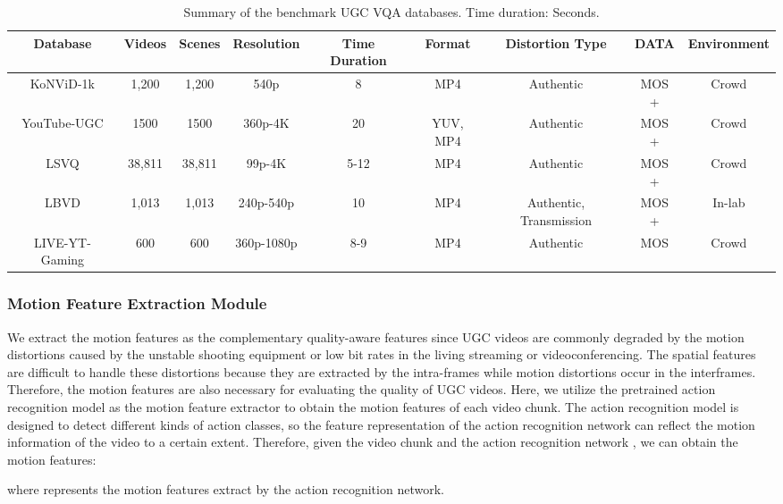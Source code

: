 \documentclass[sigconf]{acmart}
\begin{document}
\begin{table*}
\small
	\centering
	\renewcommand{\arraystretch}{1}
	\caption{Summary of the benchmark UGC VQA databases. Time duration: Seconds.}
	\label{the_database}
	\begin{tabular}{c|cccccccc}
		\hline
		\hline
		Database & Videos & Scenes & Resolution & Time Duration & Format & Distortion Type & DATA & Environment \\
		\hline
		KoNViD-1k \cite{hosu2017konstanz} & 1,200 & 1,200 & 540p & 8 & MP4 & Authentic & MOS +  & Crowd \\
		YouTube-UGC \cite{wang2019youtube} & 1500 & 1500 & 360p-4K & 20 & YUV, MP4 & Authentic & MOS +  & Crowd \\
		LSVQ \cite{ying2021patch} & 38,811 & 38,811 & 99p-4K & 5-12 & MP4 & Authentic & MOS +  & Crowd \\
		LBVD \cite{chen2019qoe} & 1,013 & 1,013 & 240p-540p & 10 & MP4 & Authentic, Transmission & MOS +  & In-lab \\
		LIVE-YT-Gaming \cite{yu2022subjective} & 600& 600& 360p-1080p& 8-9& MP4& Authentic& MOS & Crowd \\
		\hline
		\hline
	\end{tabular}
	
\end{table*}

\subsubsection{Motion Feature Extraction Module}
We extract the motion features as the complementary quality-aware features since UGC videos are commonly degraded by the motion distortions caused by the unstable shooting equipment or low bit rates in the living streaming or videoconferencing. The spatial features are difficult to handle these distortions because they are extracted by the intra-frames while motion distortions occur in the interframes. Therefore, the motion features are also necessary for evaluating the quality of UGC videos. Here, we utilize the pretrained action recognition model as the motion feature extractor to obtain the motion features of each video chunk. The action recognition model is designed to detect different kinds of action classes, so the feature representation of the action recognition network can reflect the motion information of the video to a certain extent. Therefore, given the video chunk  and the action recognition network , we can obtain the motion features:

where  represents the motion features extract by the action recognition network.
\end{document}
